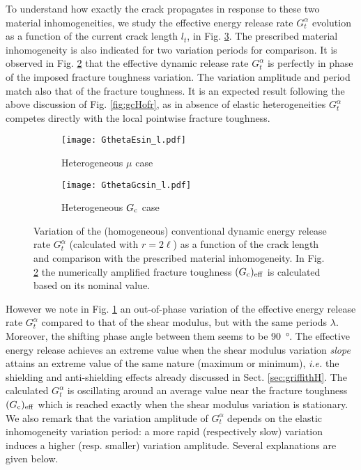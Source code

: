 To understand how exactly the crack propagates in response to these two material inhomogeneities, we study the effective energy release rate $G^\alpha_t$ evolution as a function of the current crack length $l_t$, in Fig. \ref{fig:Gtheta_l}. The prescribed material inhomogeneity is also indicated for two variation periods for comparison. It is observed in Fig. \ref{fig:gc_l} that the effective dynamic release rate $G^\alpha_t$ is perfectly in phase of the imposed fracture toughness variation. The variation amplitude and period match also that of the fracture toughness. It is an expected result following the above discussion of Fig. \ref{fig:gcHofr}, as in absence of elastic heterogeneities $G^\alpha_t$ competes directly with the local pointwise fracture toughness.
\begin{figure}[htbp]
\centering
\begin{subfigure}[b]{0.48\textwidth}
\centering
\texttt{[image: GthetaEsin\_l.pdf]}
\caption{Heterogeneous $\mu$ case} \label{fig:E_l}
\end{subfigure}
\begin{subfigure}[b]{0.48\textwidth}
\centering
\texttt{[image: GthetaGcsin\_l.pdf]}
\caption{Heterogeneous $G_\mathrm{c}$ case} \label{fig:gc_l}
\end{subfigure}
\caption{Variation of the (homogeneous) conventional dynamic energy release rate $G^\alpha_t$ (calculated with $r=2\ell$) as a function of the crack length and comparison with the prescribed material inhomogeneity. In Fig. \ref{fig:gc_l} the numerically amplified fracture toughness $(G_\mathrm{c})_\mathrm{eff}$ is calculated based on its nominal value.} \label{fig:Gtheta_l}
\end{figure}
However we note in Fig. \ref{fig:E_l} an out-of-phase variation of the effective energy release rate $G^\alpha_t$ compared to that of the shear modulus, but with the same periods $\lambda$. Moreover, the shifting phase angle between them seems to be \SI{90}{\degree}. The effective energy release achieves an extreme value when the shear modulus variation \emph{slope} attains an extreme value of the same nature (maximum or minimum), \emph{i.e.} the shielding and anti-shielding effects already discussed in Sect. \ref{sec:griffithH}. The calculated $G^\alpha_t$ is oscillating around an average value near the fracture toughness $(G_\mathrm{c})_\mathrm{eff}$ which is reached exactly when the shear modulus variation is stationary. We also remark that the variation amplitude of $G^\alpha_t$ depends on the elastic inhomogeneity variation period: a more rapid (respectively slow) variation induces a higher (resp. smaller) variation amplitude. Several explanations are given below.
